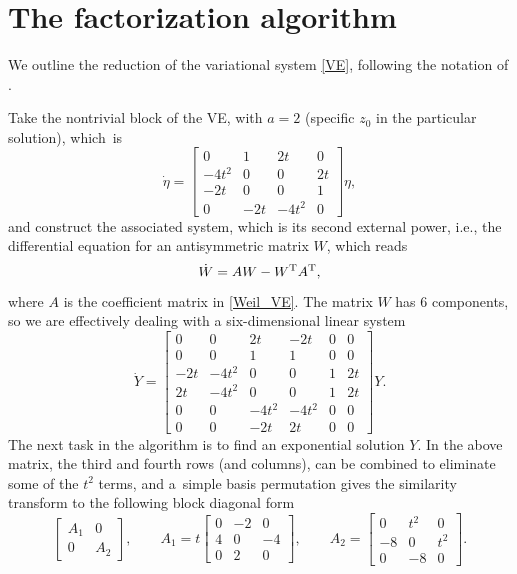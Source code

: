\documentclass[pdftex]{sigma}
\numberwithin{equation}{section}
\begin{document}
\section{The factorization algorithm}\label{App1}

We outline the reduction of the variational system \eqref{VE}, following the notation of \cite{Weil}.

Take the nontrivial block of the VE, with $a=2$ (specific $z_0$ in the
particular solution), which~is
\begin{equation}
 \dot{\eta} =
 \begin{bmatrix} 0 & 1 & 2t & 0\\
 -4t^2 & 0 & 0 & 2t \\
 -2t & 0 & 0 & 1 \\
 0 & -2t & -4t^2 & 0 \end{bmatrix}\eta,
 \label{Weil_VE}
\end{equation}
and construct the associated system, which is
its second external power, i.e., the differential equation
for an antisymmetric matrix $W$, which reads
\begin{equation*}
 \dot{W} = A W - W^{\rm T} A^{\rm T},
\end{equation*}
where $A$ is the coefficient matrix in \eqref{Weil_VE}. The matrix $W$
has 6 components, so we are effectively dealing with a six-dimensional
linear system
\begin{equation*}
\dot{Y} =
 \begin{bmatrix}
 0 & 0 & 2t & -2t & 0 & 0 \\
 0 & 0 & 1 & 1 & 0 & 0\\
 -2t & -4t^2 & 0 & 0 & 1 & 2t \\
 2t & -4t^2 & 0 & 0 & 1 & 2t \\
 0 & 0 & -4t^2 & -4t^2 & 0 & 0 \\
 0 & 0 & -2t & 2t & 0 & 0
 \end{bmatrix}Y.
\end{equation*}
The next task in the algorithm is to find an exponential solution $Y$. In the above matrix, the third and fourth rows (and columns), can be combined to eliminate some of the $t^2$ terms, and a~simple basis permutation gives the similarity transform to the following block diagonal form
\begin{equation*}
 \begin{bmatrix}
 A_1 & 0 \\ 0 & A_2
 \end{bmatrix},\qquad
 A_1 = t \begin{bmatrix}
 0 & -2 & 0\\
 4 & 0 & -4\\
 0 & 2 & 0
 \end{bmatrix}\!,\qquad
 A_2 =
 \begin{bmatrix}
 0 & t^2 & 0\\
 -8 & 0 & t^2\\
 0 & -8 & 0
 \end{bmatrix}\!.
\end{equation*}
\end{document}

